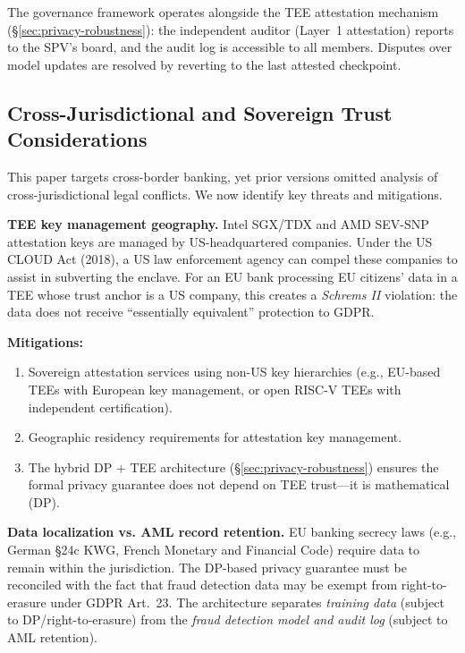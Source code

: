 \documentclass[10pt,journal]{IEEEtran}
\begin{document}
The governance framework operates alongside the TEE attestation mechanism (\S\ref{sec:privacy-robustness}): the independent auditor (Layer~1 attestation) reports to the SPV's board, and the audit log is accessible to all members. Disputes over model updates are resolved by reverting to the last attested checkpoint.

\subsection{Cross-Jurisdictional and Sovereign Trust Considerations}\label{sec:cross-jurisdiction}

This paper targets cross-border banking, yet prior versions omitted analysis of cross-jurisdictional legal conflicts. We now identify key threats and mitigations.

\textbf{TEE key management geography.} Intel SGX/TDX and AMD SEV-SNP attestation keys are managed by US-headquartered companies. Under the US CLOUD Act (2018), a US law enforcement agency can compel these companies to assist in subverting the enclave. For an EU bank processing EU citizens' data in a TEE whose trust anchor is a US company, this creates a \emph{Schrems II} violation: the data does not receive ``essentially equivalent'' protection to GDPR.

\textbf{Mitigations:}
\begin{enumerate}
  \item Sovereign attestation services using non-US key hierarchies (e.g., EU-based TEEs with European key management, or open RISC-V TEEs with independent certification).
  \item Geographic residency requirements for attestation key management.
  \item The hybrid DP + TEE architecture (\S\ref{sec:privacy-robustness}) ensures the formal privacy guarantee does not depend on TEE trust---it is mathematical (DP).
\end{enumerate}

\textbf{Data localization vs. AML record retention.} EU banking secrecy laws (e.g., German \S24c KWG, French Monetary and Financial Code) require data to remain within the jurisdiction. The DP-based privacy guarantee must be reconciled with the fact that fraud detection data may be exempt from right-to-erasure under GDPR Art.~23. The architecture separates \emph{training data} (subject to DP/right-to-erasure) from the \emph{fraud detection model and audit log} (subject to AML retention).
\end{document}
